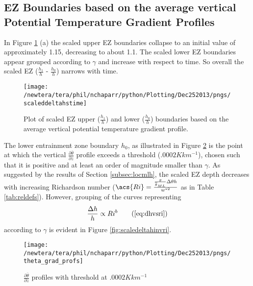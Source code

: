 \subsection{\acs{EZ} Boundaries based on the average vertical Potential Temperature Gradient Profiles}
In Figure \ref{fig:scaledEZlims} (a) the scaled upper \acs{EZ} boundaries collapse to an initial value of approximately 1.15, decreasing to about 1.1.  The scaled lower \acs{EZ} boundaries appear grouped according to $\gamma$ and increase with respect to time.  So overall the scaled \acs{EZ} ($\frac{h_{1}}{h}$ - $\frac{h_{0}}{h}$) narrows with time.\\

\begin{figure}[htbp]
    \centering
    \texttt{[image: /newtera/tera/phil/nchaparr/python/Plotting/Dec252013/pngs/scaleddeltahstime]}
    \caption{Plot of scaled \acs{EZ} upper ($\frac{h_{1}}{h}$) and lower ($\frac{h_{0}}{h}$) boundaries based on the average vertical potential temperature gradient profile.}
    \label{fig:scaledEZlims}   %
\end{figure}

The lower entrainment zone boundary $h_{0}$, as illustrated in Figure \ref{fig:thresh} is the point at which the vertical 
$\frac{\partial \overline{\theta}}{\partial z}$ profile exceeds a threshold ($.0002K km^{-1}$), chosen such that
it is positive and at least an order of magnitude smaller than $\gamma$.   
As suggested by the results of Section \ref{subsec:locmlh}, the scaled \acs{EZ} depth decreases with increasing Richardson number ($\acs{Ri} = \frac{\frac{g}{\overline{\theta}_{ML}}\Delta \theta h}{w^{*2}}$ as in Table \ref{tab:reldefs}).  However, grouping of the curves representing
\begin{equation}
\frac{\Delta h}{h} \propto Ri ^{b} \tag{\ref{eq:dhvsri}}
\end{equation}
according to $\gamma$ is evident in Figure \ref{fig:scaledeltahinvri}.\\


\begin{figure}[htbp]
    \centering
    \texttt{[image: /newtera/tera/phil/nchaparr/python/Plotting/Dec252013/pngs/theta\_grad\_profs]}
    \caption{$\frac{\partial \overline{\theta}}{\partial z}$ profiles with threshold at $.0002Kkm^{-1}$}
    \label{fig:thresh}   %
\end{figure}

